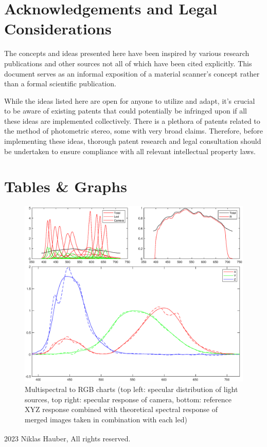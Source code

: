 \documentclass[11pt, twoside, listof=totocnumbered, bibliography=totocnumbered]{scrartcl}
\begin{document}
\section{Acknowledgements and Legal Considerations}
The concepts and ideas presented here have been inspired by various research publications and other sources not all of which have been cited explicitly. This document serves as an informal exposition of a material scanner's concept rather than a formal scientific publication.

While the ideas listed here are open for anyone to utilize and adapt, it's crucial to be aware of existing patents that could potentially be infringed upon if all these ideas are implemented collectively. There is a plethora of patents related to the method of photometric stereo, some with very broad claims. Therefore, before implementing these ideas, thorough patent research and legal consultation should be undertaken to ensure compliance with all relevant intellectual property laws.

\newpage
\section{Tables \& Graphs}
\begin{figure}[h!]
	\begin{center} 
		\includegraphics[width=1\linewidth]{chart.eps}
		\caption{Multispectral to RGB charts (top left: specular distribution of light sources, top right: specular response of camera, bottom: reference XYZ response combined with theoretical spectral response of merged images taken in combination with each led)} 
		\label{Figure 1}
	\end{center} 
\end{figure} 
\newpage

\vspace*{\fill}
\textsuperscript{\textcopyright} 2023 Niklas Hauber, All rights reserved.
\end{document}

